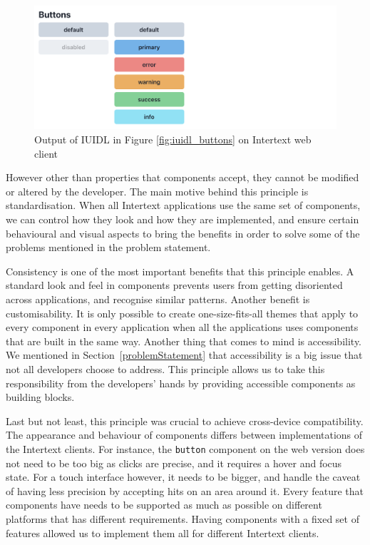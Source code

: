 \begin{figure}[htb]
  \centering
  \includegraphics[width=13cm]{thesis/paper/images/buttons.png}
  \caption{Output of IUIDL in Figure \ref{fig:iuidl_buttons} on Intertext web client}%
  \label{fig:iuidl_buttons_output}%
\end{figure}

However other than properties that components accept, they cannot be modified or altered by the developer. The main motive behind this principle is standardisation. When all Intertext applications use the same set of components, we can control how they look and how they are implemented, and ensure certain behavioural and visual aspects to bring the benefits in order to solve some of the problems mentioned in the problem statement.

Consistency is one of the most important benefits that this principle enables. A standard look and feel in components prevents users from getting disoriented across applications, and recognise similar patterns. Another benefit is customisability. It is only possible to create one-size-fits-all themes that apply to every component in every application when all the applications uses components that are built in the same way. Another thing that comes to mind is accessibility. We mentioned in Section~\ref{problemStatement} that accessibility is a big issue that not all developers choose to address. This principle allows us to take this responsibility from the developers' hands by providing accessible components as building blocks. 

Last but not least, this principle was crucial to achieve cross-device compatibility. The appearance and behaviour of components differs between implementations of the Intertext clients. For instance, the \texttt{button} component on the web version does not need to be too big as clicks are precise, and it requires a hover and focus state. For a touch interface however, it needs to be bigger, and handle the caveat of having less precision by accepting hits on an area around it. Every feature that components have needs to be supported as much as possible on different platforms that has different requirements. Having components with a fixed set of features allowed us to implement them all for different Intertext clients.

